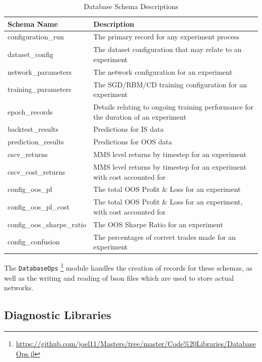 \documentclass[a4paper,11pt,oneside]{article}
\theoremstyle{plain}
\theoremstyle{definition}
\begin{document}
	\begin{table}[h]
		\begin{tabular}{|p{0.3\linewidth}|p{0.7\linewidth}|}
			\hline
			\textbf{Schema Name} &\textbf{Description}  \\\hline	
			{configuration\_run} & {The primary record for any experiment process} \\\hline
			{dataset\_config} & {The dataset configuration that may relate to an experiment} \\\hline
			{network\_parameters} & {The network configuration for an experiment} \\\hline
			{training\_parameters} & {The SGD/RBM/CD training configuration for an experiment}  \\\hline
			{epoch\_records} & {Details relating to ongoing training performance for the duration of an experiment}  \\\hline
			{backtest\_results} & {Predictions for IS data}  \\\hline
			{prediction\_results} & {Predictions for OOS data}  \\\hline
			{cscv\_returns} & {MMS level returns by timestep for an experiment}  \\\hline
			{cscv\_cost\_returns} & {MMS level returns by timestep for an experiment with cost accounted for}  \\\hline
			{config\_oos\_pl} & {The total OOS Profit \& Loss for an experiment}  \\\hline
			{config\_oos\_pl\_cost} & {The total OOS Profit \& Loss for an experiment, with cost accounted for}  \\\hline
			{config\_oos\_sharpe\_ratio} & {The OOS Sharpe Ratio for an experiment}  \\\hline
			{config\_confusion} & {The percentages of correct trades made for an experiment}  \\\hline
		\end{tabular}
		\newline\newline
		\caption{Database Schema Descriptions}\label{tab_schemas}
	\end{table}
	
	The \texttt{DatabaseOps} \footnote{\url{https://github.com/joel11/Masters/tree/master/Code\%20Libraries/DatabaseOps.jl}} module handles the creation of records for these schemas, as well as the writing and reading of bson files which are used to store actual networks.
	
	\subsection{Diagnostic Libraries}
	
\end{document}
